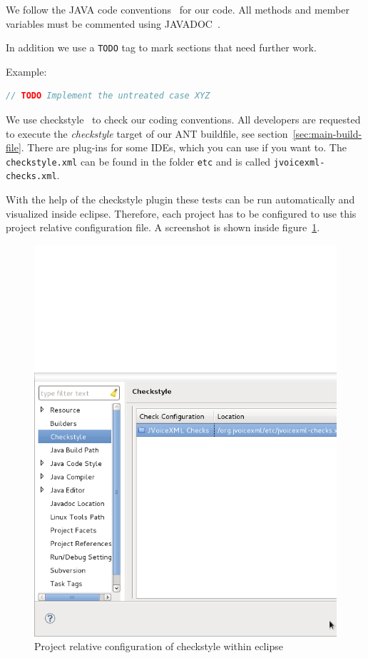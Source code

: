 \documentclass[11pt,a4paper]{article}
\begin{document}
We follow the JAVA code conventions~\cite{sun:codeconv} for our code. All
methods and member variables must be commented using 
JAVADOC~\cite{sun:javadoc_guidelines}.

In addition we use a \texttt{TODO} tag to mark sections that need further work.

Example:

\begin{lstlisting}[language=Java]
// TODO Implement the untreated case XYZ
\end{lstlisting}

We use checkstyle~\cite{checkstyle} to check our coding conventions.
All developers are requested to execute the \emph{checkstyle} target
of our ANT buildfile, see section~\ref{sec:main-build-file}. 
There are plug-ins for some IDEs, which you can use if you want to. The
\texttt{checkstyle.xml} can be found in the folder 
\texttt{etc} and is called \texttt{jvoicexml-checks.xml}.

With the help of the checkstyle plugin these tests can be run automatically
and visualized inside eclipse. Therefore, each project has to be configured to
use this project relative configuration file. A screenshot is shown inside
figure~\ref{fig:eclipse-project-checkstyle}.
\begin{figure}
\includegraphics[width=\linewidth]{eclipse-project-checkstyle.png}
\caption{Project relative configuration of checkstyle within eclipse}
\label{fig:eclipse-project-checkstyle}
\end{figure}
\end{document}
